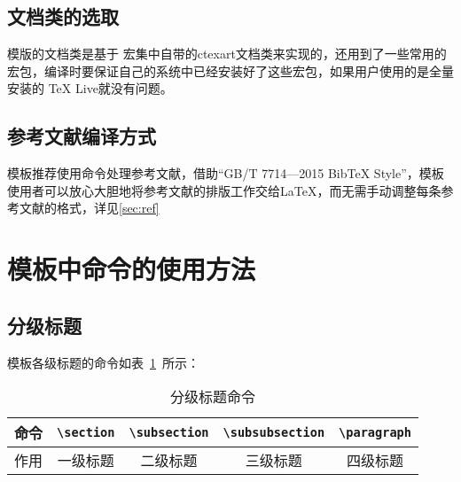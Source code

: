 \subsection{文档类的选取}

模版的文档类是基于\CTeX{} 宏集中自带的ctexart文档类来实现的\cite{x5}，还用到了一些常用的宏包，编译时要保证自己的系统中已经安装好了这些宏包，如果用户使用的是全量安装的 TeX Live就没有问题。

\subsection{参考文献编译方式}

模板推荐使用\verb||命令处理参考文献，借助“GB/T 7714—2015 BibTeX Style”\cite{x6}，模板使用者可以放心大胆地将参考文献的排版工作交给\LaTeX ，而无需手动调整每条参考文献的格式，详见\ref{sec:ref}

\section{模板中命令的使用方法}

\subsection{分级标题}

模板各级标题的命令如表~\ref{table_title_command}~所示：

\begin{table}[htbp!]
    \centering
    \caption{分级标题命令}
    \label{table_title_command}
    \begin{tabular}{ccccc}
        \toprule
        命令 & \verb|\section| & \verb|\subsection| & \verb|\subsubsection| & \verb|\paragraph| \\
        \midrule
        作用 & 一级标题        & 二级标题           & 三级标题              & 四级标题          \\
        \bottomrule
    \end{tabular}
\end{table}

